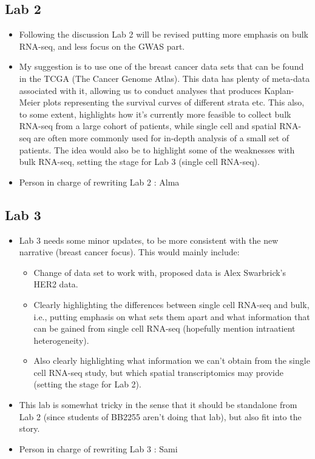 \documentclass[11pt]{article}
\begin{document}
\subsection{Lab 2}
\label{sec:org7fc0a75}
\begin{itemize}
\item Following the discussion Lab 2 will be revised putting more emphasis on bulk
RNA-seq, and less focus on the GWAS part.
\item My suggestion is to use one of the breast cancer data sets that can be found
in the TCGA (The Cancer Genome Atlas). This data has plenty of meta-data
associated with it, allowing us to conduct analyses that produces
Kaplan-Meier plots representing the survival curves of different strata etc.
This also, to some extent, highlights how it's currently more feasible to
collect bulk RNA-seq from a large cohort of patients, while single cell and
spatial RNA-seq are often more commonly used for in-depth analysis of a
small set of patients. The idea would also be to highlight some of the
weaknesses with bulk RNA-seq, setting the stage for Lab 3 (single cell
RNA-seq).
\item Person in charge of rewriting Lab 2 : Alma
\end{itemize}

\subsection{Lab 3}
\label{sec:orgec907e8}
\begin{itemize}
\item Lab 3 needs some minor updates, to be more consistent with the new
narrative (breast cancer focus). This would mainly include:
\begin{itemize}
\item Change of data set to work with, proposed data is Alex Swarbrick's HER2 data.
\item Clearly highlighting the differences between single cell RNA-seq and
bulk, i.e., putting emphasis on what sets them apart and what information
that can be gained from single cell RNA-seq (hopefully mention
intraatient heterogeneity).
\item Also clearly highlighting what information we can't obtain from the
single cell RNA-seq study, but which spatial transcriptomics may provide
(setting the stage for Lab 2).
\end{itemize}

\item This lab is somewhat tricky in the sense that it should be standalone from
Lab 2 (since students of BB2255 aren't doing that lab), but also fit into
the story.

\item Person in charge of rewriting Lab 3 : Sami
\end{itemize}
\end{document}
